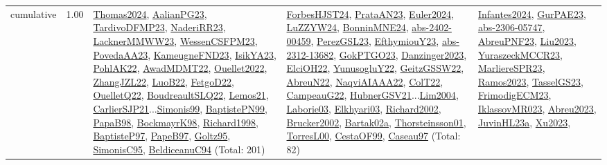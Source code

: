 {\begin{longtable}{p{3cm}r>{\raggedright\arraybackslash}p{6cm}>{\raggedright\arraybackslash}p{6cm}>{\raggedright\arraybackslash}p{8cm}}
\index{cumulative}\index{Constraints!cumulative}cumulative &  1.00 & \hyperref[detail:Thomas2024]{Thomas2024}, \hyperref[detail:AalianPG23]{AalianPG23}, \hyperref[detail:TardivoDFMP23]{TardivoDFMP23}, \hyperref[detail:NaderiRR23]{NaderiRR23}, \hyperref[detail:LacknerMMWW23]{LacknerMMWW23}, \hyperref[detail:WessenCSFPM23]{WessenCSFPM23}, \hyperref[detail:PovedaAA23]{PovedaAA23}, \hyperref[detail:KameugneFND23]{KameugneFND23}, \hyperref[detail:IsikYA23]{IsikYA23}, \hyperref[detail:PohlAK22]{PohlAK22}, \hyperref[detail:AwadMDMT22]{AwadMDMT22}, \hyperref[detail:Ouellet2022]{Ouellet2022}, \hyperref[detail:ZhangJZL22]{ZhangJZL22}, \hyperref[detail:LuoB22]{LuoB22}, \hyperref[detail:FetgoD22]{FetgoD22}, \hyperref[detail:OuelletQ22]{OuelletQ22}, \hyperref[detail:BoudreaultSLQ22]{BoudreaultSLQ22}, \hyperref[detail:Lemos21]{Lemos21}, \hyperref[detail:CarlierSJP21]{CarlierSJP21}...\hyperref[detail:Simonis99]{Simonis99}, \hyperref[detail:BaptistePN99]{BaptistePN99}, \hyperref[detail:PapaB98]{PapaB98}, \hyperref[detail:BockmayrK98]{BockmayrK98}, \hyperref[detail:Richard1998]{Richard1998}, \hyperref[detail:BaptisteP97]{BaptisteP97}, \hyperref[detail:PapeB97]{PapeB97}, \hyperref[detail:Goltz95]{Goltz95}, \hyperref[detail:SimonisC95]{SimonisC95}, \hyperref[detail:BeldiceanuC94]{BeldiceanuC94} (Total: 201) & \hyperref[detail:ForbesHJST24]{ForbesHJST24}, \hyperref[detail:PrataAN23]{PrataAN23}, \hyperref[detail:Euler2024]{Euler2024}, \hyperref[detail:LuZZYW24]{LuZZYW24}, \hyperref[detail:BonninMNE24]{BonninMNE24}, \hyperref[detail:abs-2402-00459]{abs-2402-00459}, \hyperref[detail:PerezGSL23]{PerezGSL23}, \hyperref[detail:EfthymiouY23]{EfthymiouY23}, \hyperref[detail:abs-2312-13682]{abs-2312-13682}, \hyperref[detail:GokPTGO23]{GokPTGO23}, \hyperref[detail:Danzinger2023]{Danzinger2023}, \hyperref[detail:ElciOH22]{ElciOH22}, \hyperref[detail:YunusogluY22]{YunusogluY22}, \hyperref[detail:GeitzGSSW22]{GeitzGSSW22}, \hyperref[detail:AbreuN22]{AbreuN22}, \hyperref[detail:NaqviAIAAA22]{NaqviAIAAA22}, \hyperref[detail:ColT22]{ColT22}, \hyperref[detail:CampeauG22]{CampeauG22}, \hyperref[detail:HubnerGSV21]{HubnerGSV21}...\hyperref[detail:Lim2004]{Lim2004}, \hyperref[detail:Laborie03]{Laborie03}, \hyperref[detail:Elkhyari03]{Elkhyari03}, \hyperref[detail:Richard2002]{Richard2002}, \hyperref[detail:Brucker2002]{Brucker2002}, \hyperref[detail:Bartak02a]{Bartak02a}, \hyperref[detail:Thorsteinsson01]{Thorsteinsson01}, \hyperref[detail:TorresL00]{TorresL00}, \hyperref[detail:CestaOF99]{CestaOF99}, \hyperref[detail:Caseau97]{Caseau97} (Total: 82) & \hyperref[detail:Infantes2024]{Infantes2024}, \hyperref[detail:GurPAE23]{GurPAE23}, \hyperref[detail:abs-2306-05747]{abs-2306-05747}, \hyperref[detail:AbreuPNF23]{AbreuPNF23}, \hyperref[detail:Liu2023]{Liu2023}, \hyperref[detail:YuraszeckMCCR23]{YuraszeckMCCR23}, \hyperref[detail:MarliereSPR23]{MarliereSPR23}, \hyperref[detail:Ramos2023]{Ramos2023}, \hyperref[detail:TasselGS23]{TasselGS23}, \hyperref[detail:FrimodigECM23]{FrimodigECM23}, \hyperref[detail:IklassovMR023]{IklassovMR023}, \hyperref[detail:Abreu2023]{Abreu2023}, \hyperref[detail:JuvinHL23a]{JuvinHL23a}, \hyperref[detail:Xu2023]{Xu2023}, 
\end{longtable}}
